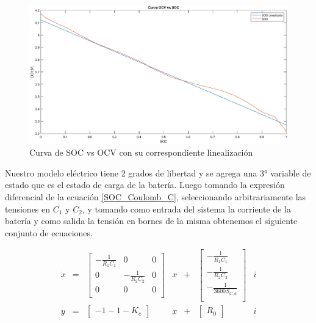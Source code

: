 \documentclass[10pt,a4paper]{article}
\begin{document}
	\clearpage
	
	\begin{figure}[h!]
		\begin{center}
			\includegraphics[width=1\textwidth]{SOC_vs_OCV.eps}
			\caption{Curva de SOC vs OCV con su correspondiente linealización }
			\label{SOC_vs_OCV}
		\end{center}
	\end{figure}
	
	
	
	
	Nuestro modelo eléctrico tiene 2 grados de libertad y se agrega una 3° variable de estado que es el estado de carga de la batería. Luego tomando la expresión diferencial de la ecuación \ref{SOC_Coulomb_C}, seleccionando arbitrariamente las tensiones en $C_1$ y $C_2$, y tomando como entrada del sistema la corriente de la batería y como salida la tensión en bornes de la misma obtenemos el siguiente conjunto de ecuaciones.
	
	\begin{equation}
		\begin{array}{llcllcl}
			\dot{x} & = & \begin{bmatrix}
				-\frac{1}{R_1 C_1} & 			0 		& 0 \\
				0				   & -\frac{1}{R_2 C_2} & 0 \\
				0      			   &   			0       & 0 \\
			\end{bmatrix} & x & + & 	\begin{bmatrix}
				-\frac{1}{R_1 C_1} \\
				-\frac{1}{R_2 C_2}  \\
				-\frac{1}{3600 S_{C,a}}\\
			\end{bmatrix} & i \\
			y & = & \begin{bmatrix}
				-1-1-K_e 
			\end{bmatrix} & x & + & \begin{bmatrix}
				R_0
			\end{bmatrix} & i \\
		\end{array}
	\end{equation}
	
\end{document}
